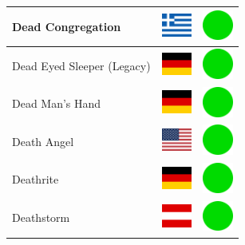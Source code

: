 \documentclass[12pt, a4paper, twoside]{report}
\begin{document}
\begin{center}
\begin{longtable}{|p{5cm}|p{2cm}|p{2cm}|}
 Dead Congregation                                          & \includegraphics[width=1cm]{../4x3/gr} &   \includegraphics[width=1cm]{../likes/y} \\ \hline
 Dead Eyed Sleeper (Legacy)                                 & \includegraphics[width=1cm]{../4x3/de} &   \includegraphics[width=1cm]{../likes/y} \\ \hline
 Dead Man's Hand                                            & \includegraphics[width=1cm]{../4x3/de} &   \includegraphics[width=1cm]{../likes/y} \\ \hline
 Death Angel                                                & \includegraphics[width=1cm]{../4x3/us} &   \includegraphics[width=1cm]{../likes/y} \\ \hline
 Deathrite                                                  & \includegraphics[width=1cm]{../4x3/de} &   \includegraphics[width=1cm]{../likes/y} \\ \hline
 Deathstorm                                                 & \includegraphics[width=1cm]{../4x3/at} &   \includegraphics[width=1cm]{../likes/y} \\ \hline

\end{longtable}
\end{center}
\end{document}
